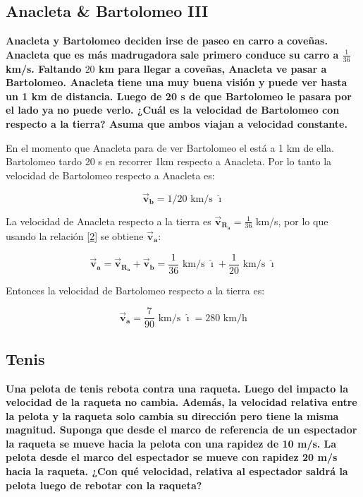 \documentclass[a4paper,11pt]{article}
\begin{document}
		\color{pb}
	\subsection{Anacleta \& Bartolomeo III}
	\textbf{Anacleta y Bartolomeo deciden irse de paseo en carro a coveñas. Anacleta que es más madrugadora sale primero conduce su carro a $\frac{1}{36}$km/s. Faltando $20$ km para llegar a coveñas, Anacleta ve pasar a Bartolomeo. Anacleta tiene una muy buena visión y puede ver hasta un 1 km de distancia. Luego de 20 s de que Bartolomeo le pasara por el lado ya no puede verlo. ¿Cuál es la velocidad de Bartolomeo con respecto a la tierra? Asuma que ambos viajan a velocidad constante.\\
	}	\color{black}
	
	En el momento que Anacleta para de ver Bartolomeo el está a 1 km de ella. Bartolomeo tardo 20 s en recorrer 1km respecto a Anacleta. Por lo tanto la velocidad de Bartolomeo respecto a Anacleta es:
	
	$$ \vec{\textbf{v}}_{\textbf{b}} = 1/20 \text{ km/s } \boldsymbol{\hat{\imath}}$$ 
	
	
	La velocidad de Anacleta respecto a la tierra es $  \vec{\textbf{v}}_{\textbf{R}_\textbf{a}}=\frac{1}{36}$ km/s, por lo que usando la relación \ref{2} se obtiene $ \vec{\textbf{v}}_{\textbf{a}}$:
	
	\begin{equation}
	\vec{\textbf{v}}_{\textbf{a}} = \vec{\textbf{v}}_{\textbf{R}_\textbf{a}} + \vec{\textbf{v}}_{\textbf{b}} =  \frac{1}{36}\text{ km/s }\boldsymbol{\hat{\imath}} + \frac{1}{20} \text{ km/s } \boldsymbol{\hat{\imath}}
	\end{equation}
	
	Entonces la velocidad de Bartolomeo respecto a la tierra es:
	
	
	\begin{equation}
	\vec{\textbf{v}}_{\textbf{a}} = \frac{7}{90} \text{ km/s } \boldsymbol{\hat{\imath}} = 280 \text{ km/h}
	\end{equation}
	
		\color{pb}
	\subsection{Tenis}
	\textbf{Una pelota de tenis rebota contra una raqueta. Luego del impacto la velocidad de la raqueta no cambia. Además, la velocidad relativa entre la pelota y la raqueta solo cambia su dirección pero tiene la misma magnitud. Suponga que desde el marco de referencia de un espectador la raqueta se mueve hacia la pelota con una rapidez de 10 m/s. La pelota desde el marco del espectador se mueve con rapidez 20 m/s hacia la raqueta. ¿Con qué velocidad, relativa al espectador saldrá la pelota luego de rebotar con la raqueta?\\
	} 
		\color{black}
	
\end{document}
